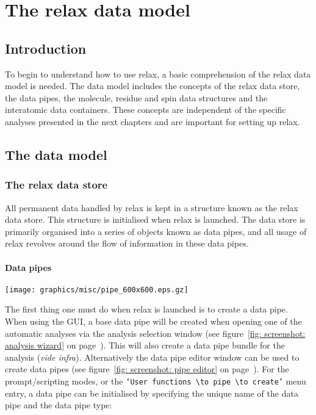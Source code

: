 
\chapter{The relax data model} \label{ch: data model}



\section{Introduction}

To begin to understand how to use relax, a basic comprehension of the relax data model is needed.  The data model includes the concepts of the relax data store, the data pipes, the molecule, residue and spin data structures and the interatomic data containers.  These concepts are independent of the specific analyses presented in the next chapters and are important for setting up relax.




\section{The data model}



\subsection{The relax data store}

All permanent data handled by relax is kept in a structure known as the relax data store.  This structure is initialised when relax is launched.  The data store is primarily organised into a series of objects known as data pipes, and all usage of relax revolves around the flow of information in these data pipes.


\subsubsection{Data pipes}

\begin{figure*}[h]
\texttt{[image: graphics/misc/pipe\_600x600.eps.gz]}
\end{figure*}

The first thing one must do when relax is launched is to create a data pipe.  When using the GUI, a base data pipe will be created when opening one of the automatic analyses via the analysis selection window (see figure~\ref{fig: screenshot: analysis wizard} on page~\pageref{fig: screenshot: analysis wizard}).  This will also create a data pipe bundle for the analysis (\textit{vide infra}).  Alternatively the data pipe editor window can be used to create data pipes (see figure~\ref{fig: screenshot: pipe editor} on page~\pageref{fig: screenshot: pipe editor}).  For the prompt/scripting modes, or the \texttt{`User functions $\to$ pipe $\to$ create'} menu entry, a data pipe can be initialised by specifying the unique name of the data pipe and the data pipe type:

